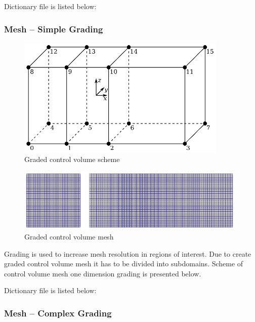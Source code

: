Dictionary file is listed below:
\begin{codelistdict}
  
\end{codelistdict}

\subsubsection{Mesh -- Simple Grading}

\begin{figure}[h!]
  \centering
  \includegraphics[width=100mm]{eps/openfoam_control_volume_2_1.eps}
  \caption{Graded control volume scheme}
\end{figure}

\begin{figure}[h!]
  \centering
  \includegraphics[width=110mm]{eps/openfoam_control_volume_2_1_para.eps}
  \caption{Graded control volume mesh}
\end{figure}

Grading is used to increase mesh resolution in regions of interest. Due to create graded control volume mesh it has to be divided into subdomains. Scheme of control volume mesh one dimension grading is presented below.

Dictionary file is listed below:
\begin{codelistdict}
  
\end{codelistdict}

\subsubsection{Mesh -- Complex Grading}


